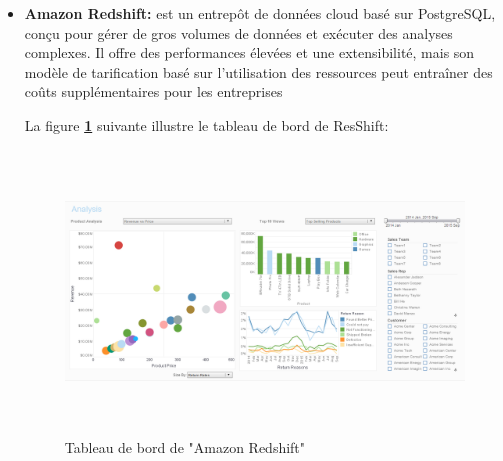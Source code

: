 \begin{itemize}
    \item\textbf{Amazon Redshift:} est un entrepôt de données cloud basé sur PostgreSQL, conçu pour gérer de gros volumes de données et exécuter des analyses complexes.
    Il offre des performances élevées et une extensibilité, mais son modèle de tarification basé sur l'utilisation des ressources peut entraîner des coûts supplémentaires pour les entreprises
    \par La figure \textbf{\ref{fig:RS}} suivante illustre le tableau de bord de ResShift:
            \begin{figure}[H]
            \centering
            \includegraphics[width =13cm, height=7.5cm]{img/captures/redshift}
            \caption{Tableau de bord de "Amazon Redshift"}
            \label{fig:RS}
            \end{figure}
\end{itemize}

